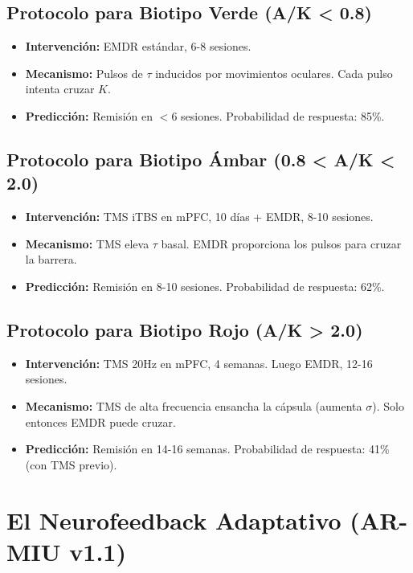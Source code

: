 \documentclass[12pt,openany]{book}
\begin{document}
\section{Protocolo para Biotipo Verde (A/K < 0.8)}
\begin{itemize}
  \item \textbf{Intervención:} EMDR estándar, 6-8 sesiones.
  \item \textbf{Mecanismo:} Pulsos de $\tau$ inducidos por movimientos
        oculares. Cada pulso intenta cruzar $K$.
  \item \textbf{Predicción:} Remisión en $<6$ sesiones. Probabilidad de
        respuesta: 85\%.
\end{itemize}

\section{Protocolo para Biotipo Ámbar (0.8 < A/K < 2.0)}
\begin{itemize}
  \item \textbf{Intervención:} TMS iTBS en mPFC, 10 días + EMDR, 8-10
        sesiones.
  \item \textbf{Mecanismo:} TMS eleva $\tau$ basal. EMDR proporciona los
        pulsos para cruzar la barrera.
  \item \textbf{Predicción:} Remisión en 8-10 sesiones. Probabilidad de
        respuesta: 62\%.
\end{itemize}

\section{Protocolo para Biotipo Rojo (A/K > 2.0)}
\begin{itemize}
  \item \textbf{Intervención:} TMS 20Hz en mPFC, 4 semanas. Luego EMDR,
        12-16 sesiones.
  \item \textbf{Mecanismo:} TMS de alta frecuencia ensancha la cápsula
        (aumenta $\sigma$). Solo entonces EMDR puede cruzar.
  \item \textbf{Predicción:} Remisión en 14-16 semanas. Probabilidad de
        respuesta: 41\% (con TMS previo).
\end{itemize}

\chapter{El Neurofeedback Adaptativo (AR-MIU v1.1)}
\end{document}

